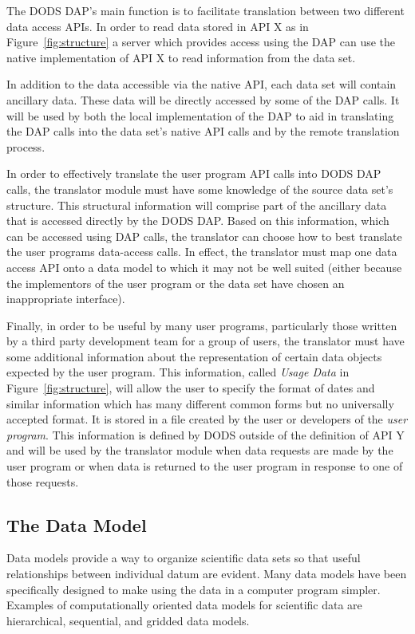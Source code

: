 The DODS DAP's main function is to facilitate translation between two
different data access APIs. In order to read data stored in API X as in
Figure~\ref{fig:structure} a server which provides access using the DAP can
use the native implementation of API X to read information from the data set.

In addition to the data accessible via the native API, each data set will
contain ancillary data. These data will be directly accessed by some of the
DAP calls. It will be used by both the local implementation of the DAP to aid
in translating the DAP calls into the data set's native API calls and by
the remote translation process.

In order to effectively translate the user program API calls into DODS DAP
calls, the translator module must have some knowledge of the source data set's
structure. This structural information will comprise part of the ancillary
data that is accessed directly by the DODS DAP\@. Based on this information,
which can be accessed using DAP calls, the translator can choose how to best
translate the user programs data-access calls. In effect, the translator must
map one data access API onto a data model to which it may not be well suited
(either because the implementors of the user program or the data set have
chosen an inappropriate interface).

Finally, in order to be useful by many user programs, particularly those
written by a third party development team for a group of users, the
translator must have some additional information about the representation of
certain data objects expected by the user program. This information, called
{\em Usage Data\/} in Figure~\ref{fig:structure}, will allow the user to
specify the format of dates and similar information which has many different
common forms but no universally accepted format. It is stored in a file
created by the user or developers of the {\em user program}. This
information is defined by DODS outside of the definition of API Y and will be
used by the translator module when data requests are made by the user program
or when data is returned to the user program in response to one of those
requests.

\subsection{The Data Model}

Data models provide a way to organize scientific data sets so that useful
relationships between individual datum are evident. Many data models have
been specifically designed to make using the data in a computer program
simpler. Examples of computationally oriented data models for scientific data
are hierarchical, sequential, and gridded data models. 

